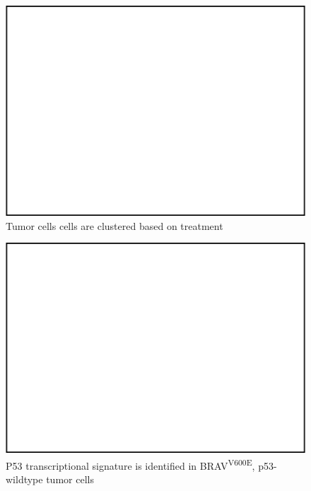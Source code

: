 \begin{figure}
\hypertarget{fig:04}{%
\centering
\includegraphics[width=1\textwidth,height=\textheight]{images/scrna_3.png}
\caption{Tumor cells cells are clustered based on treatment}\label{fig:04}
}
\end{figure}

\begin{figure}
\hypertarget{fig:04}{%
\centering
\includegraphics[width=1\textwidth,height=\textheight]{images/scrna_4.png}
\caption{P53 transcriptional signature is identified in BRAV\textsuperscript{V600E}, p53-wildtype tumor cells}\label{fig:04}
}
\end{figure}


